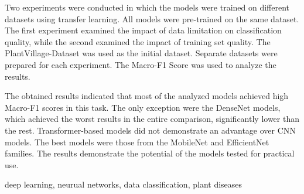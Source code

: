 \documentclass[
    left=2.5cm,         %
    right=2.5cm,        %
    top=2.5cm,          %
    bottom=3cm,         %
    bindingoffset=6mm,  %
    nohyphenation=false %
]{eiti/eiti-thesis}
\begin{document}
Two experiments were conducted in which the models were trained on different datasets using transfer learning. All models were pre-trained on the same dataset. The first experiment examined the impact of data limitation on classification quality, while the second examined the impact of training set quality. The PlantVillage-Dataset was used as the initial dataset. Separate datasets were prepared for each experiment. The Macro-F1 Score was used to analyze the results.

The obtained results indicated that most of the analyzed models achieved high Macro-F1 scores in this task. The only exception were the DenseNet models, which achieved the worst results in the entire comparison, significantly lower than the rest. Transformer-based models did not demonstrate an advantage over CNN models. The best models were those from the MobileNet and EfficientNet families. The results demonstrate the potential of the models tested for practical use.

\keywords deep learning, neurual networks, data classification, plant diseases

\cleardoublepage  %
\pagestyle{plain}
\makeauthorship

\cleardoublepage %
\tableofcontents

\cleardoublepage
\pagestyle{headings}

 
    








\newpage 
\cleardoublepage 
\printbibliography

\newpage
\pagestyle{plain}

\vspace{0.8cm}
\acronymlist
{}
\end{document}
